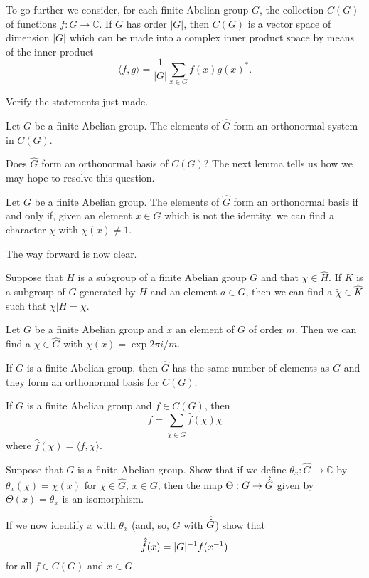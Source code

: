 To go further we consider, for each finite Abelian group
$G$, the collection $C(G)$ of functions $f:G\rightarrow{\mathbb C}$.
If $G$ has order $|G|$, then $C(G)$ is a vector space of
dimension $|G|$ which can be made into a  complex inner
product space by means of the inner product
\[\langle f,g\rangle=\frac{1}{|G|}\sum_{x\in G}f(x)g(x)^{*}.\]
\begin{exercise} Verify the statements just made.
\end{exercise}

\begin{lemma} Let $G$ be a finite Abelian group.
The elements of $\hat{G}$ form an orthonormal
system in  $C(G)$.
\end{lemma}
Does $\hat{G}$ form an orthonormal basis of $C(G)$? The
next lemma tells us how we may hope to resolve this
question.
\begin{lemma} Let $G$ be a finite Abelian group.
The elements of $\hat{G}$  form an orthonormal basis
if and only if, given an element $x\in G$ which is
not the identity, we can find a character $\chi$
with $\chi(x)\neq 1$.
\end{lemma}

The way forward is now clear.
\begin{lemma}
Suppose that $H$ is a subgroup of a finite Abelian
group  $G$ and that $\chi\in\hat{H}$. If $K$
is a subgroup of $G$ generated by $H$ and an element
$a\in G$, then we can find a $\tilde{\chi}\in\hat{K}$
such that $\tilde{\chi}|H=\chi$.
\end{lemma}
\begin{lemma} Let $G$ be a finite Abelian group
and $x$ an element of $G$ of order $m$. Then
we can find a $\chi\in\hat{G}$ with
$\chi(x)=\exp 2\pi i/m$.
\end{lemma}
\begin{theorem} If $G$ is a finite Abelian group,
then $\hat{G}$ has the same number of elements
as $G$ and they form an orthonormal basis
for $C(G)$.
\end{theorem}
\begin{lemma} If $G$ is a finite Abelian group
and $f\in C(G)$, then
\[f=\sum_{\chi\in\hat{G}}\hat{f}(\chi)\chi\]
where $\hat{f}(\chi)=\langle f,\chi \rangle$.
\end{lemma}
\begin{exercise} Suppose that $G$ is a finite Abelian
group. Show that if we define
$\theta_{x}:\hat{G}\rightarrow {\mathbb C}$ by
$\theta_{x}(\chi)=\chi(x)$ for $\chi\in \hat{G}$,
$x\in G$, then the map $\Theta:G\rightarrow\Hat{\Hat{G}}$
given by $\Theta(x)=\theta_{x}$ is an isomorphism.

If we now identify $x$ with $\theta_{x}$ (and, so,
$G$ with $\Hat{\Hat{G}}$) show that
\[\Hat{\Hat{f}}(x)=|G|^{-1}f(x^{-1})\]
for all $f\in C(G)$ and $x\in G$.
\end{exercise}

